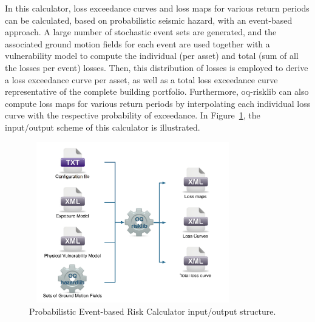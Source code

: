 In this calculator, loss exceedance curves and loss maps for various return
periods can be calculated, based on probabilistic seismic hazard, with an
event-based approach. A large number of stochastic event sets are generated,
and the associated ground motion fields for each event are used together with
a vulnerability model to compute the individual (per asset) and total (sum of
all the losses per event) losses. Then, this distribution of losses is
employed to derive a loss exceedance curve per asset, as well as a total loss
exceedance curve representative of the complete building portfolio.
Furthermore, oq-risklib can also compute loss maps for various return periods
by interpolating each individual loss curve with the respective probability of
exceedance. In Figure~\ref{fig:io-structure-event-based-risk}, the
input/output scheme of this calculator is illustrated.

\begin{figure}[ht]
\centering
\includegraphics[width=9cm,height=7cm]{figures/risk/io-structure-event-based-risk.pdf}
\caption{Probabilistic Event-based Risk Calculator input/output structure.}
\label{fig:io-structure-event-based-risk}
\end{figure}